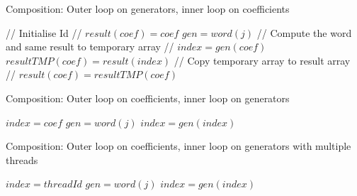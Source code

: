 {\begin{algorithm}
\caption{Composition: Outer loop on generators, inner loop on coefficients}
\label{algo:composebad}
\begin{algorithmic}
\STATE // Initialise Id //
\STATE $result(coef) = coef$
\ENDFOR
{}
\STATE $gen = word(j)$
\STATE // Compute the word and same result to temporary array //
\STATE $index = gen(coef)$
\STATE $resultTMP(coef) = result(index)$
\ENDFOR
\STATE // Copy temporary array to result array //
\STATE $result(coef) = resultTMP(coef)$
\ENDFOR
\ENDFOR
\end{algorithmic}
\end{algorithm}



\begin{algorithm}
\caption{Composition: Outer loop on coefficients, inner loop on generators}
\label{algo:composegood}
\begin{algorithmic}
\STATE $index = coef$
\STATE $gen = word(j)$
\STATE $index = gen(index)$
\ENDFOR
\ENDFOR
\end{algorithmic}
\end{algorithm}


\begin{algorithm}
\caption{Composition: Outer loop on coefficients, inner loop on generators with multiple threads}
\label{algo:composepar}
\begin{algorithmic}
\STATE $index = threadId$
\STATE $gen = word(j)$
\STATE $index = gen(index)$
\ENDFOR
\ENDIF
\end{algorithmic}
\end{algorithm}


}
